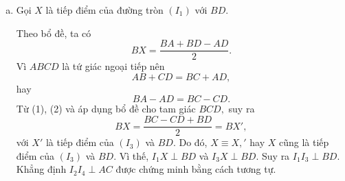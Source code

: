 \begin{bt}
{\begin{enumerate}[a)]
			\item Gọi $X$ là tiếp điểm của đường tròn  $(I_1)$ với $BD.$
			\begin{center}
			\end{center}
			Theo bổ đề, ta có
			\begin{equation*}
			BX= \dfrac{BA+BD-AD}{2}. \tag{1}
			\end{equation*}
			Vì $ABCD$ là tứ giác ngoại tiếp nên $$AB +CD = BC +AD,$$ hay
			\begin{equation*}
			BA -AD = BC -CD. \tag{2}
			\end{equation*}
			Từ (1), (2) và áp dụng bổ đề cho tam giác $BCD,$ suy ra
			$$BX= \dfrac{BC-CD +BD}{2}= BX',$$
			với $X'$ là tiếp điểm của $(I_3)$ và $BD.$ Do đó, $X \equiv X,'$ hay $X$ cũng là tiếp điểm của $(I_3)$ và $BD.$ Vì thế, $I_1X\perp BD$ và $I_3X \perp BD.$ Suy ra $I_1I_3 \perp BD.$\\
			Khẳng định $I_2I_4 \perp AC$ được chứng minh bằng cách tương tự.
			

\end{enumerate}}
\end{bt}
